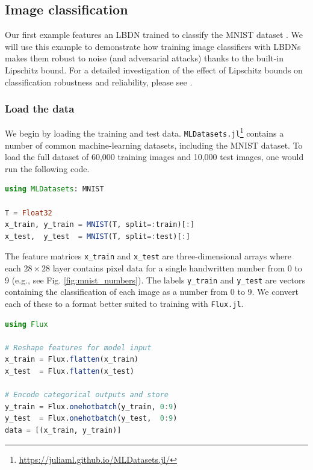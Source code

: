 \subsection{Image classification} \label{sec:mnist}

Our first example features an LBDN trained to classify the MNIST dataset \cite{LeCun++2010}. We will use this example to demonstrate how training image classifiers with LBDNs makes them robust to noise (and adversarial attacks) thanks to the built-in Lipschitz bound. For a detailed investigation of the effect of Lipschitz bounds on classification robustness and reliability, please see \cite{Wang+Manchester2023}.

\subsubsection{Load the data} \label{sec:mnist-data}

We begin by loading the training and test data. \verb|MLDatasets.jl|\footnote{\url{https://juliaml.github.io/MLDatasets.jl/}} contains a number of common machine-learning datasets, including the MNIST dataset. To load the full dataset of 60,000 training images and 10,000 test images, one would run the following code.

\begin{lstlisting}[language = Julia]
using MLDatasets: MNIST

T = Float32
x_train, y_train = MNIST(T, split=:train)[:]
x_test,  y_test  = MNIST(T, split=:test)[:]
\end{lstlisting}

The feature matrices \verb|x_train| and \verb|x_test| are three-dimensional arrays where each $28 \times 28$ layer contains pixel data for a single handwritten number from 0 to 9 (e.g., see Fig. \ref{fig:mnist_numbers}). The labels \verb|y_train| and \verb|y_test| are vectors containing the classification of each image as a number from 0 to 9. We convert each of these to a format better suited to training with \verb|Flux.jl|.

\begin{lstlisting}[language = Julia]
using Flux

# Reshape features for model input
x_train = Flux.flatten(x_train)
x_test  = Flux.flatten(x_test)

# Encode categorical outputs and store
y_train = Flux.onehotbatch(y_train, 0:9)
y_test  = Flux.onehotbatch(y_test,  0:9)
data = [(x_train, y_train)]
\end{lstlisting}

